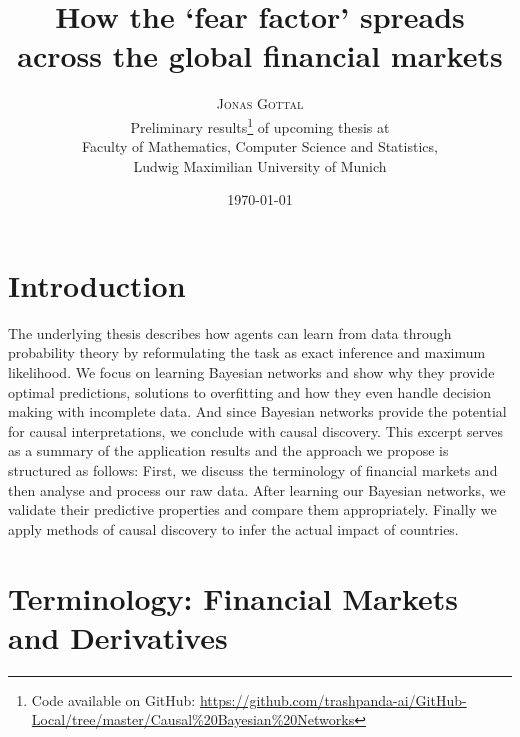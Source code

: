 \documentclass[twoside,twocolumn]{article}
\title{How the `fear factor' spreads across the global financial markets} %
\author{%
\textsc{Jonas Gottal}\\[1ex] %
\normalsize Preliminary results\thanks{Code available on GitHub:  \url{https://github.com/trashpanda-ai/GitHub-Local/tree/master/Causal\%20Bayesian\%20Networks}} of upcoming thesis at \\\normalsize Faculty of Mathematics, Computer Science and Statistics, \\\normalsize  Ludwig Maximilian University of Munich%
}
\date{\today} %
\begin{document}
\maketitle

\section{Introduction}
The underlying thesis describes how agents can learn from data through probability theory by reformulating the task as exact inference and maximum likelihood. We focus on learning Bayesian networks and show why they provide optimal predictions, solutions to overfitting and how they even handle decision making with incomplete data. And since Bayesian networks provide the potential for causal interpretations, we conclude with causal discovery.  
This excerpt serves as a summary of the application results and the approach we propose is structured as follows: First, we discuss the terminology of financial markets and then analyse and process our raw data. After learning our Bayesian networks, we validate their predictive properties and compare them appropriately. Finally we apply methods of causal discovery to infer the actual impact of countries.

\section{Terminology: Financial Markets and Derivatives}
\end{document}
